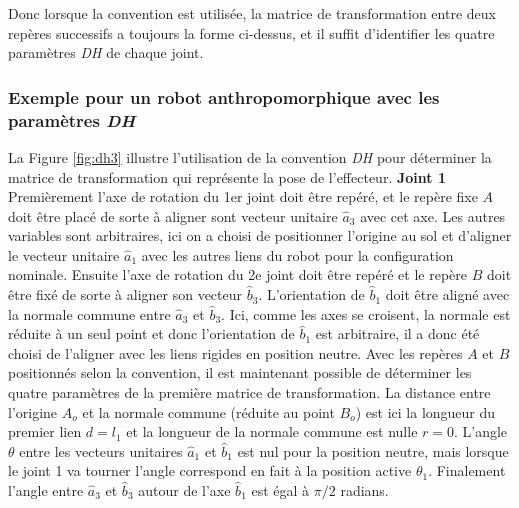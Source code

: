 Donc lorsque la convention est utilisée, la matrice de transformation entre deux repères successifs a toujours la forme ci-dessus, et il suffit d'identifier les quatre paramètres \textit{DH} de chaque joint.


\subsubsection{Exemple pour un robot anthropomorphique avec les paramètres \textit{DH}}
\label{sec:dhex}

La Figure \ref{fig:dh3} illustre l'utilisation de la convention \textit{DH} pour déterminer la matrice de transformation qui représente la pose de l'effecteur.
%
\textbf{Joint 1} Premièrement l'axe de rotation du 1er joint doit être repéré, et le repère fixe $A$ doit être placé de sorte à aligner sont vecteur unitaire $\hat{a}_3$ avec cet axe. Les autres variables sont arbitraires, ici on a choisi de positionner l'origine au sol et d'aligner le vecteur unitaire $\hat{a}_1$ avec les autres liens du robot pour la configuration nominale. Ensuite l'axe de rotation du 2e joint doit être repéré et le repère $B$ doit être fixé de sorte à aligner son vecteur $\hat{b}_3$. L'orientation de $\hat{b}_1$ doit être aligné avec la normale commune entre $\hat{a}_3$ et $\hat{b}_3$. Ici, comme les axes se croisent, la normale est réduite à un seul point et donc l'orientation de $\hat{b}_1$ est arbitraire, il a donc été choisi de l'aligner avec les liens rigides en position neutre. Avec les repères $A$ et $B$ positionnés selon la convention, il est maintenant possible de déterminer les quatre paramètres de la première matrice de transformation. La distance entre l'origine $A_o$ et la normale commune (réduite au point $B_o$) est ici la longueur du premier lien $d= l_1$ et la longueur de la normale commune est nulle $r = 0$. L'angle $\theta$ entre les vecteurs unitaires $\hat{a}_1$ et $\hat{b}_1$ est nul pour la position neutre, mais lorsque le joint 1 va tourner l'angle correspond en fait à la position active $\theta_1$. Finalement l'angle entre $\hat{a}_3$ et $\hat{b}_3$ autour de l'axe $\hat{b}_1$ est égal à $\pi/2$ radians.
%
